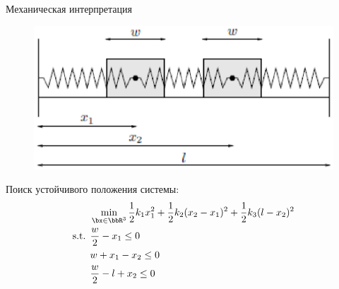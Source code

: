 \documentclass[12pt]{beamer}
\begin{document}
\begin{frame}{Механическая интерпретация}
\begin{figure}
\centering
\includegraphics[scale=0.5]{kkt_mechanics.eps}
\end{figure}
Поиск устойчивого положения системы:
\begin{equation*}
\begin{split}
& \min_{\bx \in \bbR^3} \frac{1}{2}k_1x_1^2 + \frac{1}{2}k_2(x_2 - x_1)^2 + \frac{1}{2}k_3 (l - x_2)^2\\
\text{s.t. } & \frac{w}{2} - x_1 \leq 0\\
& w + x_1 - x_2 \leq 0\\
& \frac{w}{2} - l + x_2 \leq 0
\end{split}
\end{equation*}

\end{frame}
\end{document}
